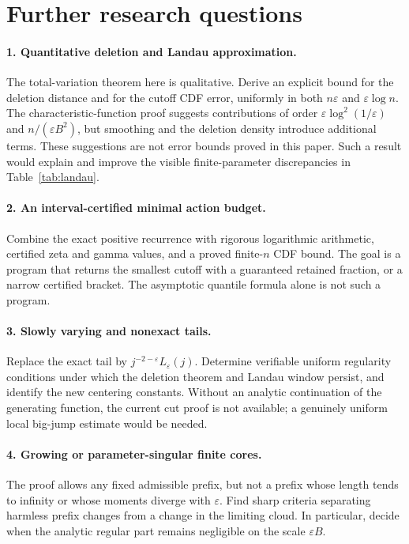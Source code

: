 \documentclass[11pt,a4paper]{article}
\theoremstyle{definition}\newtheorem{definition}[theorem]{Definition}
\theoremstyle{remark}\newtheorem{remark}[theorem]{Remark}
\newcommand{\eps}{\varepsilon}
\newcommand{\1}{\mathbf 1}
\begin{document}
\section{Further research questions}
\label{sec:future}

\paragraph{1. Quantitative deletion and Landau approximation.}
The total-variation theorem here is qualitative. Derive an explicit
bound for the deletion distance and for the cutoff CDF error, uniformly
in both $n\eps$ and $\eps\log n$. The characteristic-function proof
suggests contributions of order
$\eps\log^2(1/\eps)$ and $n/(\eps B^2)$, but smoothing and the deletion
density introduce additional terms. These suggestions are not error
bounds proved in this paper. Such a result would explain and improve
the visible finite-parameter discrepancies in Table~\ref{tab:landau}.

\paragraph{2. An interval-certified minimal action budget.}
Combine the exact positive recurrence with rigorous logarithmic
arithmetic, certified zeta and gamma values, and a proved finite-$n$
CDF bound. The goal is a program that returns the smallest cutoff with
a guaranteed retained fraction, or a narrow certified bracket. The
asymptotic quantile formula alone is not such a program.

\paragraph{3. Slowly varying and nonexact tails.}
Replace the exact tail by
$j^{-2-\eps}L_{\eps}(j)$. Determine verifiable uniform regularity
conditions under which the deletion theorem and Landau window persist,
and identify the new centering constants. Without an analytic
continuation of the generating function, the current cut proof is not
available; a genuinely uniform local big-jump estimate would be needed.

\paragraph{4. Growing or parameter-singular finite cores.}
The proof allows any fixed admissible prefix, but not a prefix whose
length tends to infinity or whose moments diverge with $\eps$.
Find sharp criteria separating harmless prefix changes from a change
in the limiting cloud. In particular, decide when the analytic regular
part remains negligible on the scale $\eps B$.
\end{document}
